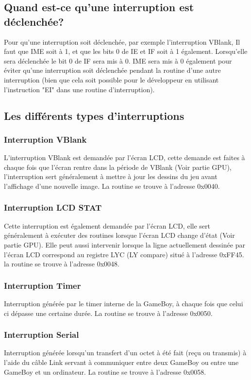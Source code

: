 \documentclass{report}
\begin{document}
\subsection{Quand est-ce qu'une interruption est déclenchée?}
Pour qu'une interruption soit déclenchée, par exemple l'interruption VBlank, Il faut que IME soit à 1, et que les bits 0 de IE et IF soit à 1 également.
Lorsqu'elle sera déclenchée le bit 0 de IF sera mis à 0. IME sera mis à 0 également pour éviter qu'une interruption soit déclenchée pendant la routine d'une autre interruption (bien que cela soit possible pour le développeur en utilisant l'instruction "EI" dans une routine d'interruption).
\subsection{Les différents types d'interruptions}
\subsubsection{Interruption VBlank}
L'interruption VBlank est demandée par l'écran LCD, cette demande est faites à chaque fois que l'écran rentre dans la période de VBlank (Voir partie GPU), l'interruption sert généralement à mettre à jour les dessins du jeu avant l'affichage d'une nouvelle image. La routine se trouve à l'adresse 0x0040.
\subsubsection{Interruption LCD STAT}
Cette interruption est également demandée par l'écran LCD, elle sert généralement à exécuter des routines lorsque l'écran LCD change d'état (Voir partie GPU). Elle peut aussi intervenir lorsque la ligne actuellement dessinée par l'écran LCD correspond au registre LYC (LY compare) situé à l'adresse 0xFF45. la routine se trouve à l'adresse 0x0048.
\subsubsection{Interruption Timer}
Interruption générée par le timer interne de la GameBoy, à chaque fois que celui ci dépasse une certaine durée. La routine se trouve à l'adresse 0x0050.
\subsubsection{Interruption Serial}
Interruption générée lorsqu'un transfert d'un octet à été fait (reçu ou transmis) à l'aide du câble Link servant à communiquer entre deux GameBoy ou entre une GameBoy et un ordinateur. La routine se trouve à l'adresse 0x0058.
\end{document}
